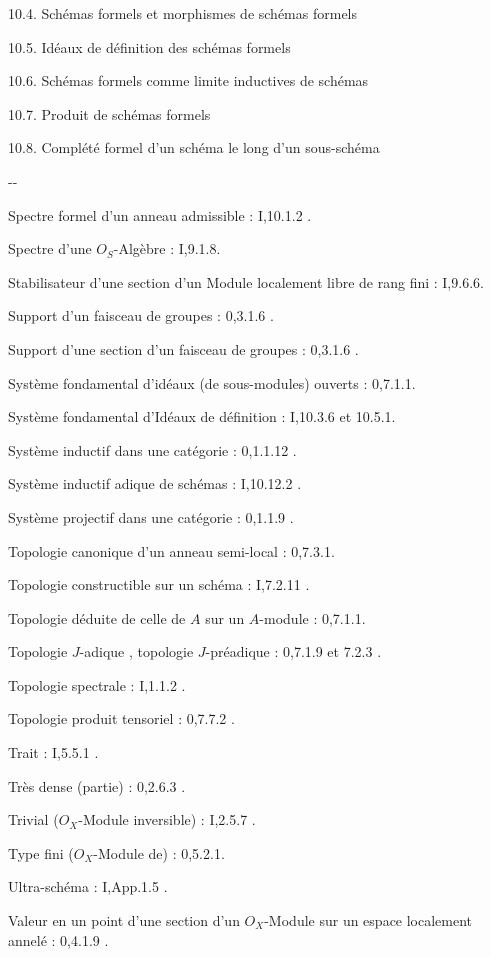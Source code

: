 10.4. Schémas formels et morphismes de schémas formels\dotfill

10.5. Idéaux de définition des schémas formels\dotfill

10.6. Schémas formels comme limite inductives de schémas

10.7. Produit de schémas formels\dotfill

10.8. Complété formel d'un schéma le long d'un sous-schéma\dotfill
\begin{center}-\qquad -\end{center}

Spectre formel d'un anneau admissible : I,10.1.2 .

Spectre d'une $O_S$-Algèbre : I,9.1.8.

Stabilisateur d'une section d'un Module localement libre de rang fini : I,9.6.6.

Support d'un faisceau de groupes :  0,3.1.6 .

Support d'une section d'un faisceau de groupes : 0,3.1.6 .

Système fondamental d'idéaux (de sous-modules) ouverts : 0,7.1.1.

Système fondamental d'Idéaux de définition : I,10.3.6 et 10.5.1.

Système inductif dans une catégorie : 0,1.1.12 .

Système inductif adique de schémas : I,10.12.2 .

Système projectif dans une catégorie : 0,1.1.9 .

Topologie canonique d'un anneau semi-local : 0,7.3.1.

Topologie constructible sur un schéma :  I,7.2.11 .

Topologie déduite de celle de $A$ sur un $A$-module : 0,7.1.1.

Topologie $J$-adique , topologie $J$-préadique : 0,7.1.9 et 7.2.3 .

Topologie spectrale : I,1.1.2 .

Topologie produit tensoriel : 0,7.7.2 .

Trait : I,5.5.1 .

Très dense (partie) : 0,2.6.3 .

Trivial ($O_X$-Module inversible) : I,2.5.7 .

Type fini ($O_X$-Module de) : 0,5.2.1.

Ultra-schéma : I,App.1.5 .

Valeur en un point d'une section d'un $O_X$-Module sur un espace localement annelé : 0,4.1.9 .

